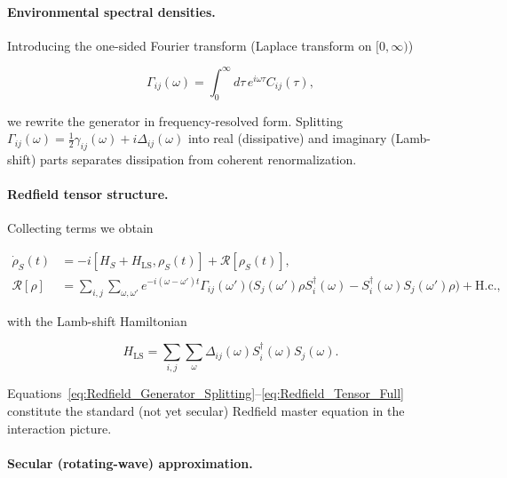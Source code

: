 \paragraph{Environmental spectral densities.}

\noindent
Introducing the one-sided Fourier transform (Laplace transform on $[0, \infty)$)

\begin{equation}
	\Gamma_{ij}(\omega) = \int_0^{\infty} d\tau \, e^{i \omega \tau} C_{ij}(\tau),
	\label{eq:Redfield_Rates_Definition}
\end{equation}

\noindent
we rewrite the generator in frequency-resolved form. Splitting $\Gamma_{ij}(\omega) = \tfrac{1}{2} \gamma_{ij}(\omega) + i \Delta_{ij}(\omega)$ into real (dissipative) and imaginary (Lamb-shift) parts separates dissipation from coherent renormalization.

\paragraph{Redfield tensor structure.} Collecting terms we obtain

\begin{align}
	\dot{\rho}_S(t)   & = -i [H_S + H_{\text{LS}}, \rho_S(t)] + \mathcal{R}[\rho_S(t)], \label{eq:Redfield_Generator_Splitting}                                                                                                                         \\
	\mathcal{R}[\rho] & = \sum_{i,j} \sum_{\omega,\omega'} e^{-i(\omega - \omega') t} \Gamma_{ij}(\omega') \Big( S_j(\omega') \rho S_i^{\dagger}(\omega) - S_i^{\dagger}(\omega) S_j(\omega') \rho \Big) + \text{H.c.}, \label{eq:Redfield_Tensor_Full}
\end{align}

\noindent
with the Lamb-shift Hamiltonian

\begin{equation}
	H_{\text{LS}} = \sum_{i,j} \sum_{\omega} \Delta_{ij}(\omega) S_i^{\dagger}(\omega) S_j(\omega).
	\label{eq:Lamb_Shift_Hamiltonian}
\end{equation}

\noindent
Equations~\eqref{eq:Redfield_Generator_Splitting}--\eqref{eq:Redfield_Tensor_Full} constitute the standard (not yet secular) Redfield master equation in the interaction picture.

\paragraph{Secular (rotating-wave) approximation.}

